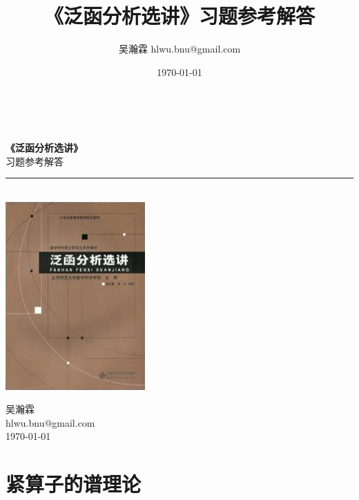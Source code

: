 \documentclass[UTF8,twoside]{ctexbook}
\title{《泛函分析选讲》习题参考解答}
\author{吴瀚霖 hlwu.bnu@gmail.com}
\date{\today}
\numberwithin{equation}{section}
\newcommand{\HRule}{\rule{\linewidth}{0.5mm}}
\begin{document}
	\begin{titlepage}
		\begin{center}

			\ \vspace{2cm}

			{ \Huge \bfseries 《泛函分析选讲》}\\[0.4em] \huge{习题参考解答} \\[0.4em]
			\HRule \\[2cm]

			\includegraphics[width=0.4\textwidth]{pics/fm.jpg}

			\vfill

			{\large 吴瀚霖 \\ hlwu.bnu@gmail.com\\ \today}
		\end{center}
	\end{titlepage}
	\tableofcontents
	\chapter{紧算子的谱理论}
\end{document}
